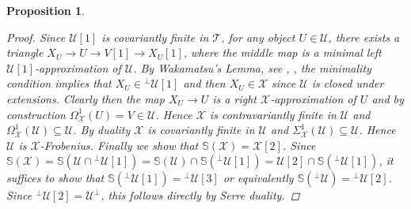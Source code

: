 \documentclass[oneside, a4paper,reqno]{amsart}
\numberwithin{equation}{section}
\newtheorem{prop}[thm]{Proposition}
\theoremstyle{definition}
\begin{document}
\begin{prop}
\begin{proof}
Since ${\mathcal U}[1]$ is covariantly finite in ${\mathcal T}$, for any object $U \in {\mathcal U}$, there exists a triangle $X_{U} {\longrightarrow} U {\longrightarrow} V[1] {\longrightarrow} X_{U}[1]$, where the middle map is a minimal left ${\mathcal U}[1]$-approximation of ${\mathcal U}$. By Wakamatsu's Lemma, see \cite{BR}, \cite{IY}, the minimality condition implies that $X_{U} \in {^{\bot}}{\mathcal U}[1]$ and then $X_{U} \in {\mathcal X}$ since ${\mathcal U}$ is closed under extensions. Clearly then the map $X_{U} {\longrightarrow} U$ is a right ${\mathcal X}$-approximation of $U$ and by construction $\Omega^{1}_{\mathcal X}(U) = V \in {\mathcal U}$. Hence ${\mathcal X}$ is contravariantly finite in ${\mathcal U}$ and $\Omega^{1}_{\mathcal X}({\mathcal U}) \subseteq {\mathcal U}$.  By duality ${\mathcal X}$ is covariantly finite in ${\mathcal U}$ and $\Sigma^{1}_{\mathcal X}({\mathcal U}) \subseteq {\mathcal U}$. Hence ${\mathcal U}$ is ${\mathcal X}$-Frobenius.  Finally we show that $\mathbb S({\mathcal X}) = {\mathcal X}[2]$. Since $\mathbb S({\mathcal X}) = \mathbb S({\mathcal U} \cap {^{\bot}}{\mathcal U}[1]) = \mathbb S({\mathcal U}) \cap \mathbb S({^{\bot}}{\mathcal U}[1]) = {\mathcal U}[2] \cap \mathbb S({^{\bot}}{\mathcal U}[1])$, it suffices to show that $\mathbb S({^{\bot}}{\mathcal U}[1]) = {^{\bot}}{\mathcal U}[3]$ or equivalently $\mathbb S({^{\bot}}{\mathcal U}) = {^{\bot}}{\mathcal U}[2]$. Since ${^{\bot}}{\mathcal U}[2] = {\mathcal U}^{\bot}$, this follows directly by Serre duality.


\end{proof}
\end{prop}
\end{document}
